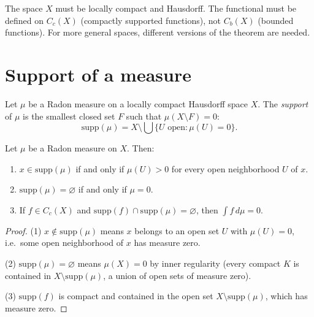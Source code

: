 \begin{attention}[title=\textbf{Conditions of the theorem}]
The space $X$ must be locally compact and Hausdorff. The functional must be defined
on $C_c(X)$ (compactly supported functions), not $C_b(X)$ (bounded functions). For
more general spaces, different versions of the theorem are needed.
\end{attention}

\section{Support of a measure}

\begin{definition}
\label{def:support_measure}
Let $\mu$ be a Radon measure on a locally compact Hausdorff space $X$. The
\emph{support} of $\mu$ is the smallest closed set $F$ such that
$\mu(X \setminus F) = 0$:
\[
    \mathrm{supp}(\mu) = X \setminus \bigcup\{U \text{ open} : \mu(U) = 0\}.
\]
\end{definition}

\begin{proposition}
Let $\mu$ be a Radon measure on $X$. Then:
\begin{enumerate}
    \item $x \in \mathrm{supp}(\mu)$ if and only if $\mu(U) > 0$ for every open
    neighborhood $U$ of $x$.
    \item $\mathrm{supp}(\mu) = \varnothing$ if and only if $\mu = 0$.
    \item If $f \in C_c(X)$ and
    $\mathrm{supp}(f) \cap \mathrm{supp}(\mu) = \varnothing$, then
    $\int f\, d\mu = 0$.
\end{enumerate}
\end{proposition}

\begin{proof}
(1) $x \notin \mathrm{supp}(\mu)$ means $x$ belongs to an open set $U$ with
$\mu(U) = 0$, i.e.\ some open neighborhood of $x$ has measure zero.

(2) $\mathrm{supp}(\mu) = \varnothing$ means $\mu(X) = 0$ by inner regularity
(every compact $K$ is contained in $X \setminus \mathrm{supp}(\mu)$, a union of
open sets of measure zero).

(3) $\mathrm{supp}(f)$ is compact and contained in the open set
$X \setminus \mathrm{supp}(\mu)$, which has measure zero.
\end{proof}


